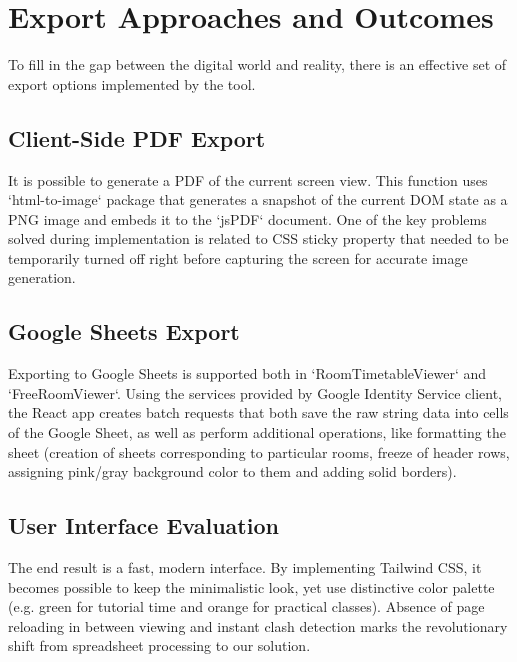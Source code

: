 \section{Export Approaches and Outcomes}

To fill in the gap between the digital world and reality, there is an effective set of export options implemented by the tool.

\subsection{Client-Side PDF Export}
It is possible to generate a PDF of the current screen view. This function uses `html-to-image` package that generates a snapshot of the current DOM state as a PNG image and embeds it to the `jsPDF` document. One of the key problems solved during implementation is related to CSS sticky property that needed to be temporarily turned off right before capturing the screen for accurate image generation.

\subsection{Google Sheets Export}
Exporting to Google Sheets is supported both in `RoomTimetableViewer` and `FreeRoomViewer`. Using the services provided by Google Identity Service client, the React app creates batch requests that both save the raw string data into cells of the Google Sheet, as well as perform additional operations, like formatting the sheet (creation of sheets corresponding to particular rooms, freeze of header rows, assigning pink/gray background color to them and adding solid borders).

\subsection{User Interface Evaluation}
The end result is a fast, modern interface. By implementing Tailwind CSS, it becomes possible to keep the minimalistic look, yet use distinctive color palette (e.g. green for tutorial time and orange for practical classes). Absence of page reloading in between viewing and instant clash detection marks the revolutionary shift from spreadsheet processing to our solution.



